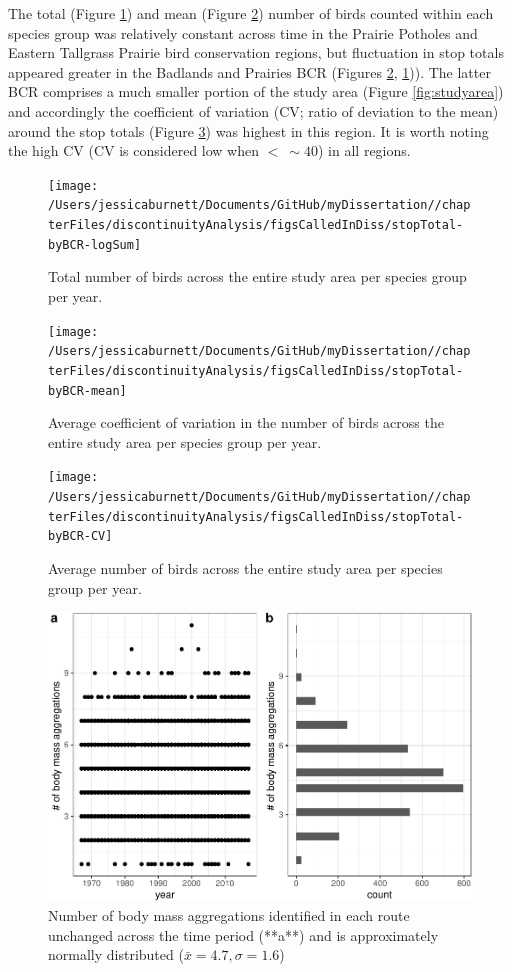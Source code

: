 \documentclass[12pt,twoside,openany]{reedthesis}
\begin{document}
The total (Figure \ref{fig:stopTotalSum}) and mean (Figure \ref{fig:stopTotalMean}) number of birds counted within each species group was relatively constant across time in the Prairie Potholes and Eastern Tallgrass Prairie bird conservation regions, but fluctuation in stop totals appeared greater in the Badlands and Prairies BCR (Figures \ref{fig:stopTotalMean}, \ref{fig:stopTotalSum})). The latter BCR comprises a much smaller portion of the study area (Figure \ref{fig:studyarea}) and accordingly the coefficient of variation (CV; ratio of deviation to the mean) around the stop totals (Figure \ref{fig:stopTotalCV}) was highest in this region. It is worth noting the high CV (CV is considered low when \(<\ \sim40%
\)) in all regions.
\begin{figure}
\texttt{[image: /Users/jessicaburnett/Documents/GitHub/myDissertation//chapterFiles/discontinuityAnalysis/figsCalledInDiss/stopTotal-byBCR-logSum]} \caption{Total number of birds across the entire study area per species group per year. }\label{fig:stopTotalSum}
\end{figure}
\begin{figure}
\texttt{[image: /Users/jessicaburnett/Documents/GitHub/myDissertation//chapterFiles/discontinuityAnalysis/figsCalledInDiss/stopTotal-byBCR-mean]} \caption{Average coefficient of variation in the number of birds across the entire study area per species group per year.}\label{fig:stopTotalMean}
\end{figure}
\begin{figure}
\texttt{[image: /Users/jessicaburnett/Documents/GitHub/myDissertation//chapterFiles/discontinuityAnalysis/figsCalledInDiss/stopTotal-byBCR-CV]} \caption{Average number of birds across the entire study area per species group per year. }\label{fig:stopTotalCV}
\end{figure}
\begin{figure}
\includegraphics[width=0.85\linewidth]{_myDissertation_files/figure-latex/nAggsPerYear-1} \caption{Number of body mass aggregations identified in each route unchanged across the time period (**a**) and is approximately normally distributed ($\bar{x} =  4.7, \sigma = 1.6$)}\label{fig:nAggsPerYear}
\end{figure}
\end{document}
